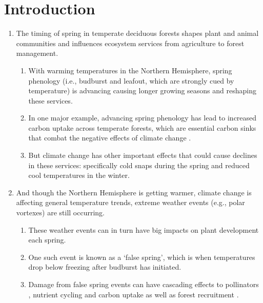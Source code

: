 \documentclass{article}\usepackage[]{graphicx}\usepackage[]{color}
\begin{document}
\section*{Introduction}
\begin{enumerate}
\item The timing of spring in temperate deciduous forests shapes plant and animal communities and influences ecosystem services from agriculture to forest management. %
  \begin{enumerate} 
  \item With warming temperatures in the Northern Hemisphere, spring phenology (i.e., budburst and leafout, which  are strongly cued by temperature) is advancing causing longer growing seasons \citep{Chuine2001} and reshaping these services.  
  \item In one major example, advancing spring phenology has lead to increased carbon uptake across temperate forests, which are essential carbon sinks that combat the negative effects of climate change \citep{Keenan2014}.
  \item But climate change has other important effects that could cause declines in these services: specifically cold snaps during the spring and reduced cool temperatures in the winter. %
  \end{enumerate}
  
\item And though the Northern Hemisphere is getting warmer, climate change is affecting general temperature trends, extreme weather events (e.g., polar vortexes) are still occurring. 
  \begin{enumerate}
  \item These weather events can in turn have big impacts on plant development each spring. 
  \item One such event is known as a `false spring', which is when temperatures drop below freezing \citep[][i.e., below -2.2$^{\circ}$C]{Schwartz2002} after budburst has initiated.
  \item Damage from false spring events can have cascading effects to pollinators \citep{Boggs2012, Pardee2017}, nutrient cycling and carbon uptake as well as forest recruitment \citep{Hufkens2012, Klosterman2018, Richardson2013}.
  \end{enumerate}


\end{enumerate}
\end{document}
